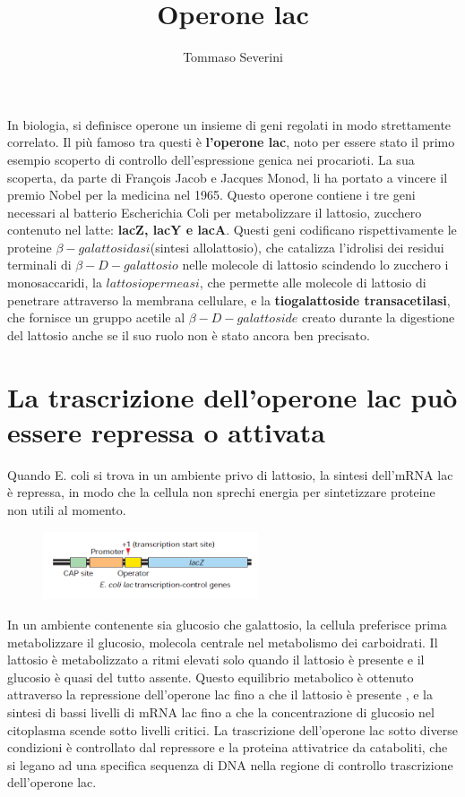 \documentclass[10pt,a4paper]{article}
\author{Tommaso Severini}
\title{Operone lac}
\begin{document}
	\maketitle
	
	In biologia, si definisce operone un insieme di geni regolati in modo strettamente correlato. Il più famoso tra questi è \textbf{l'operone lac}, noto per essere stato il primo esempio scoperto di controllo dell'espressione genica nei procarioti. La sua scoperta, da parte di  François Jacob e Jacques Monod, li ha portato a vincere il premio Nobel per la medicina nel 1965. Questo operone contiene i tre geni necessari al batterio Escherichia Coli per metabolizzare il lattosio, zucchero contenuto nel latte: \textbf{lacZ, lacY e lacA}. Questi geni codificano rispettivamente le proteine \textbf{$\beta-galattosidasi$}(sintesi allolattosio), che catalizza l'idrolisi dei residui terminali di $\beta-D-galattosio$ nelle molecole di lattosio scindendo lo zucchero i monosaccaridi, la \textbf{$lattosio permeasi$}, che permette alle molecole di lattosio di penetrare attraverso la membrana cellulare, e la \textbf{tiogalattoside transacetilasi}, che fornisce un gruppo acetile al $\beta-D-galattoside$ creato durante la digestione del lattosio anche se il suo ruolo non è stato ancora ben precisato.
	
	\section{La trascrizione dell'operone lac può essere repressa o attivata}	
	
	Quando E. coli si trova in un ambiente privo di lattosio, la sintesi dell'mRNA lac è repressa, in modo che la cellula non sprechi energia per sintetizzare proteine non utili al momento.
	\begin{figure}
		\includegraphics[width=2.5in]{operone.png}
	\end{figure}
	In un ambiente contenente sia glucosio che galattosio, la cellula preferisce prima metabolizzare il glucosio, molecola centrale nel metabolismo dei carboidrati. Il lattosio è metabolizzato a ritmi elevati solo quando il lattosio è presente e il glucosio è quasi del tutto assente. Questo equilibrio metabolico è ottenuto attraverso la repressione dell'operone lac fino a che il lattosio è presente , e la sintesi di bassi livelli di mRNA lac fino a che la concentrazione di glucosio nel citoplasma scende sotto livelli critici. La trascrizione dell'operone lac sotto diverse condizioni è controllato dal repressore e la proteina attivatrice da cataboliti, che si legano ad una specifica sequenza di DNA nella regione di controllo trascrizione dell'operone lac.
	
\end{document}
